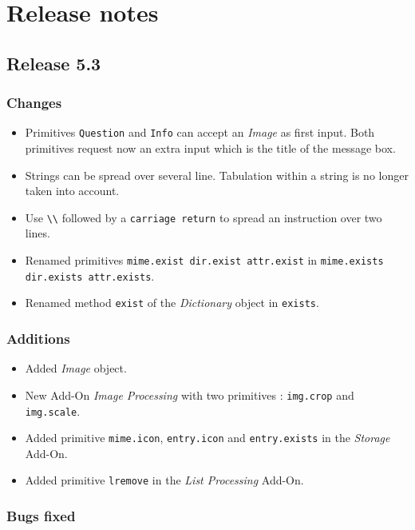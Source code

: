 \chapter{Release notes}

\section{Release 5.3}

\subsection{Changes}

\begin{itemize}
\item Primitives {\tt Question} and {\tt Info} can accept an {\it Image} as first input. Both primitives request now an extra input which is the title of the message box.
\item Strings can be spread over several line. Tabulation within a string is no longer taken into account.
\item Use \verb+\\+ followed by a {\tt carriage return} to spread an instruction
over two lines.
\item Renamed primitives {\tt mime.exist dir.exist attr.exist} in {\tt mime.exists dir.exists attr.exists}.
\item Renamed method {\tt exist} of the {\it Dictionary} object in {\tt exists}. 
\end{itemize}

\subsection{Additions}

\begin{itemize}
\item Added {\it Image} object.
\item New Add-On {\em Image Processing} with two primitives : {\tt img.crop} and {\tt img.scale}.
\item Added primitive {\tt mime.icon}, {\tt entry.icon} and {\tt entry.exists} in the {\em Storage} Add-On.
\item Added primitive {\tt lremove} in the {\em List Processing} Add-On.
\end{itemize}

\subsection{Bugs fixed}

